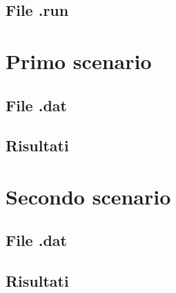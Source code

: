 \documentclass[12pt]{article}
\begin{document}
    \subsection{File .run}
    \section{Primo scenario}
    \subsection{File .dat}
    \subsection{Risultati}
    \section{Secondo scenario}
    \subsection{File .dat}
    \subsection{Risultati}
\end{document}
